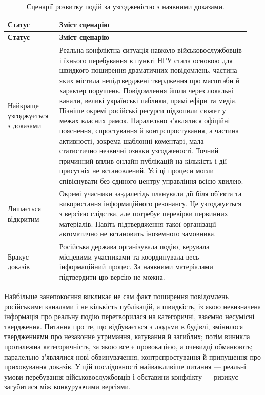 \begin{longtable}{@{}>{\raggedright\arraybackslash}p{0.2\linewidth}>{\raggedright\arraybackslash}p{0.74\linewidth}@{}}
\caption{Сценарії розвитку подій за узгодженістю з наявними доказами.}\label{tab:scen}\\
\toprule\textbf{Статус} & \textbf{Зміст сценарію}\\\midrule\endfirsthead
\toprule\textbf{Статус} & \textbf{Зміст сценарію}\\\midrule\endhead
\bottomrule\endfoot
\footnotesize Найкраще узгоджується з доказами & \footnotesize Реальна конфліктна ситуація навколо військовослужбовців і їхнього перебування в пункті НГУ стала основою для швидкого поширення драматичних повідомлень, частина яких містила непідтверджені твердження про масштаби й характер порушень. Повідомлення йшли через локальні канали, великі українські паблики, прямі ефіри та медіа. Пізніше окремі російські ресурси підхопили сюжет у межах власних рамок. Паралельно з'являлися офіційні пояснення, спростування й контрспростування, а частина активності, зокрема шаблонні коментарі, мала статистично незвичні ознаки узгодженості. Точний причинний вплив онлайн-публікацій на кількість і дії присутніх не встановлений. Усі ці процеси могли співіснувати без єдиного центру управління всією хвилею.\\
\footnotesize Лишається відкритим & \footnotesize Окремі учасники заздалегідь планували дії біля об'єкта та використання інформаційного резонансу. Це узгоджується з версією слідства, але потребує перевірки первинних матеріалів. Навіть підтвердження такої організації автоматично не встановить іноземного замовника.\\
\footnotesize Бракує доказів & \footnotesize Російська держава організувала подію, керувала місцевими учасниками та координувала весь інформаційний процес. За наявними матеріалами підтвердити цю версію не можна.\\
\end{longtable}

Найбільше занепокоєння викликає не сам факт поширення повідомлень російськими каналами і не кількість публікацій, а швидкість, із якою невизначена інформація про реальну подію перетворилася на категоричні, взаємно несумісні твердження. Питання про те, що відбувається з людьми в будівлі, змінилося твердженнями про незаконне утримання, катування й загиблих; потім виникла протилежна категоричність, за якою все є провокацією, а очевидці обманюють; паралельно з'являлися нові обвинувачення, контрспростування й припущення про приховування доказів. У цій послідовності найважливіше питання --- реальні умови перебування військовослужбовців і обставини конфлікту --- ризикує загубитися між конкуруючими версіями.

